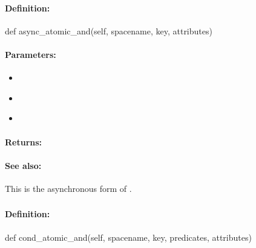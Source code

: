 \paragraph{Definition:}
\begin{pythoncode}
def async_atomic_and(self, spacename, key, attributes)
\end{pythoncode}

\paragraph{Parameters:}
\begin{itemize}[noitemsep]
\item {}\\

\item {}\\

\item {}\\

\end{itemize}

\paragraph{Returns:}


\paragraph{See also:}  This is the asynchronous form of .

\pagebreak
\subsubsection{}
\label{api:python:cond_atomic_and}


\paragraph{Definition:}
\begin{pythoncode}
def cond_atomic_and(self, spacename, key, predicates, attributes)
\end{pythoncode}

